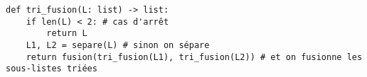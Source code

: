 \ifprof
\begin{corrige}
\end{corrige}
\else
\fi




\ifprof
\begin{corrige}
\begin{lstlisting}
def tri_fusion(L: list) -> list:
    if len(L) < 2: # cas d'arrêt
        return L
    L1, L2 = separe(L) # sinon on sépare
    return fusion(tri_fusion(L1), tri_fusion(L2)) # et on fusionne les sous-listes triées
\end{lstlisting}
\end{corrige}
\else
\fi


